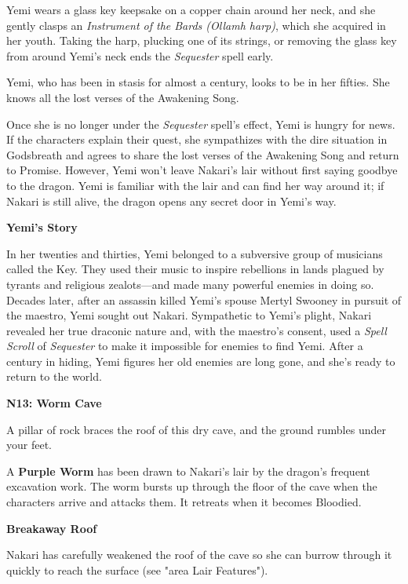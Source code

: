\documentclass[letterpaper, 11pt, twocolumn]{dndbook}
\begin{document}
Yemi wears a glass key keepsake on a copper chain around her neck, and she gently clasps an \textit{Instrument of the Bards (Ollamh harp)}, which she acquired in her youth. Taking the harp, plucking one of its strings, or removing the glass key from around Yemi's neck ends the \textit{Sequester} spell early.

Yemi, who has been in stasis for almost a century, looks to be in her fifties. She knows all the lost verses of the Awakening Song.

Once she is no longer under the \textit{Sequester} spell's effect, Yemi is hungry for news. If the characters explain their quest, she sympathizes with the dire situation in Godsbreath and agrees to share the lost verses of the Awakening Song and return to Promise. However, Yemi won't leave Nakari's lair without first saying goodbye to the dragon. Yemi is familiar with the lair and can find her way around it; if Nakari is still alive, the dragon opens any secret door in Yemi's way.

\textbf{Yemi's Story}

In her twenties and thirties, Yemi belonged to a subversive group of musicians called the Key. They used their music to inspire rebellions in lands plagued by tyrants and religious zealots---and made many powerful enemies in doing so. Decades later, after an assassin killed Yemi's spouse Mertyl Swooney in pursuit of the maestro, Yemi sought out Nakari. Sympathetic to Yemi's plight, Nakari revealed her true draconic nature and, with the maestro's consent, used a \textit{Spell Scroll} of \textit{Sequester} to make it impossible for enemies to find Yemi. After a century in hiding, Yemi figures her old enemies are long gone, and she's ready to return to the world.


\textbf{N13: Worm Cave}

\begin{DndReadAloud}
A pillar of rock braces the roof of this dry cave, and the ground rumbles under your feet.
\end{DndReadAloud}

A \textbf{Purple Worm} has been drawn to Nakari's lair by the dragon's frequent excavation work. The worm bursts up through the floor of the cave when the characters arrive and attacks them. It retreats when it becomes Bloodied.

\textbf{Breakaway Roof}

Nakari has carefully weakened the roof of the cave so she can burrow through it quickly to reach the surface (see "area Lair Features").
\end{document}
